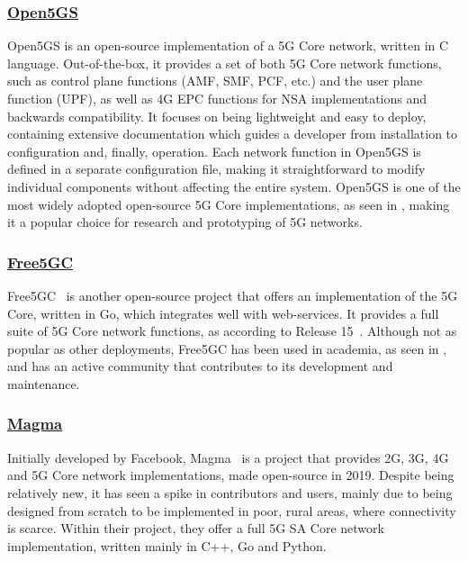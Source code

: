 \subsubsection*{\normalfont\uline{Open5GS}}
Open5GS \cite{open5gs_repo} is an open-source implementation of a 5G Core network, written in C language. Out-of-the-box, it provides a set of both 5G Core network functions, such as control plane functions (\gls{AMF}, \gls{SMF}, \gls{PCF}, etc.) and the user plane function (\gls{UPF}), as well as 4G \gls{EPC} functions for \gls{NSA} implementations and backwards compatibility. It focuses on being lightweight and easy to deploy, containing extensive documentation which guides a developer from installation to configuration and, finally, operation. Each network function in Open5GS is defined in a separate configuration file, making it straightforward to modify individual components without affecting the entire system.
Open5GS is one of the most widely adopted open-source 5G Core implementations, as seen in \cites{bonati2025_5gct}{horstmann2025open5gcube}{mamushiane2023deploying}{tio2025exploring5g}, making it a popular choice for research and prototyping of 5G networks.

\subsubsection*{\normalfont\uline{Free5GC}}
\label{sec:free5gc}

Free5GC~\cite{free5gc_repo} is another open-source project that offers an implementation of the 5G Core, written in Go, which integrates well with web-services. It provides a full suite of 5G Core network functions, as according to  Release 15~\cite{3GPPRelease15}. Although not as popular as other deployments, Free5GC has been used in academia, as seen in \cite{horstmann2025open5gcube}, and has an active community that contributes to its development and maintenance.

\subsubsection*{\normalfont\uline{Magma}}
\label{sec:magma}
Initially developed by Facebook, Magma~\cite{magma_repo} is a project that provides 2G, 3G, 4G and 5G Core network implementations, made open-source in 2019. Despite being relatively new, it has seen a spike in contributors and users, mainly due to being designed from scratch to be implemented in poor, rural areas, where connectivity is scarce. Within their project, they offer a full 5G \gls{SA} Core network implementation, written mainly in C++, Go and Python.

